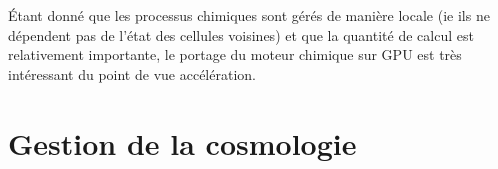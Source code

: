 Étant donné que les processus chimiques sont gérés de manière locale (ie ils ne dépendent pas de l'état des cellules voisines) et que la quantité de calcul est relativement importante, le portage du moteur chimique sur \ac{GPU} est très intéressant du point de vue accélération.


\section{Gestion de la cosmologie}
\label{sec:supercomobil}



%
%
%
%


